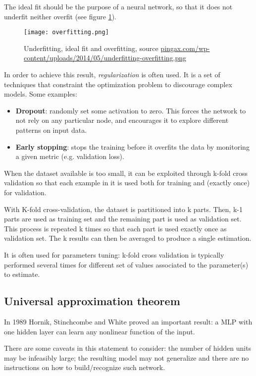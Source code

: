 The ideal fit should be the purpose of a neural network, so that it does not underfit neither overfit (see figure \ref{fig:overfitting}).

\begin{figure}
  \centering
  \texttt{[image: overfitting.png]}
  \caption{Underfitting, ideal fit and overfitting, source \url{pingax.com/wp-content/uploads/2014/05/underfitting-overfitting.png}}
  \label{fig:overfitting}
\end{figure}

In order to achieve this result, \textit{regularization} is often used. It is a set of techniques that constraint the optimization problem to discourage complex models. Some examples:

\begin{itemize}
 \item \textbf{Dropout}: randomly set some activation to zero. This forces the network to not rely on any particular node, and encourages it to explore different patterns on input data.
 \item \textbf{Early stopping}: stops the training before it overfits the data by monitoring a given metric (e.g. validation loss).
\end{itemize}

When the dataset available is too small, it can be exploited through k-fold cross validation so that each example in it is used both for training and (exactly once) for validation.

With K-fold cross-validation, the dataset is partitioned into k parts. Then, k-1 parts are used as training set and the remaining part is used as validation set. This process is repeated k times so that each part is used exactly once as validation set.
The k results can then be averaged to produce a single estimation.

It is often used for parameters tuning: k-fold cross validation is typically performed several times for different set of values associated to the parameter(s) to estimate.

\subsection{Universal approximation theorem}

In 1989 Hornik, Stinchcombe and White proved an important result: a MLP with one hidden layer can learn any nonlinear function of the input.

There are some caveats in this statement to consider: the number of hidden units may be infeasibly large; the resulting model may not generalize and there are no instructions on how to build/recognize such network.

